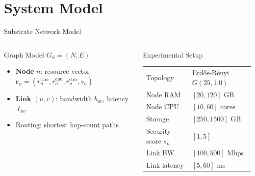 \section{System Model}

\begin{frame}{Substrate Network Model}
  \begin{columns}[T]
      \begin{block}{Graph Model $G_S = (N, E)$}
        \footnotesize
        \begin{itemize}
          \item \textbf{Node} $n$: resource vector
            $\mathbf{r}_n = (r_n^{\text{ram}}, r_n^{\text{cpu}}, r_n^{\text{stor}}, s_n)$
          \item \textbf{Link} $(u,v)$: bandwidth $b_{uv}$, latency $\ell_{uv}$
          \item Routing: shortest hop-count paths
        \end{itemize}
      \end{block}
      \vspace{4pt}
      \begin{block}{Experimental Setup}
        \footnotesize
        \begin{tabular}{ll}
          Topology & Erdős-Rényi $G(25, 1.0)$\\
          Node RAM & $[20, 120]$ GB\\
          Node CPU & $[10, 60]$ cores\\
          Storage  & $[250, 1500]$ GB\\
          Security score $s_n$ & $[1, 5]$\\
          Link BW  & $[100, 500]$ Mbps\\
          Link latency & $[5, 60]$ ms\\
        \end{tabular}
      \end{block}
      \centering
\end{columns}
\end{frame}
